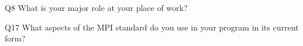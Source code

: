 \begin{description}%
\item{Q8} What is your major role at your place of work?%
\item{Q17} What aspects of the MPI standard do you use in your program in its current form?%
\end{description}%
